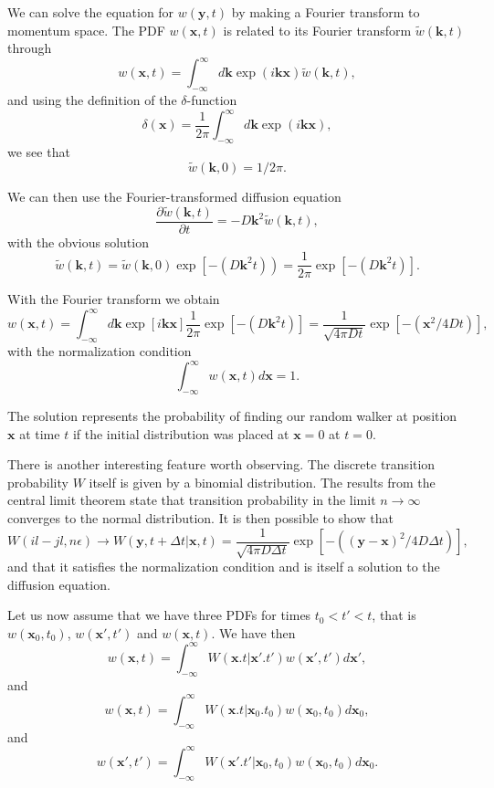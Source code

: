 \documentclass[%
oneside,                 %
final,                   %
10pt]{article}
\begin{document}
We can solve the equation for $w(\mathbf{y},t)$ by making a Fourier transform to
momentum space. 
The PDF $w(\mathbf{x},t)$ is related to its Fourier transform
$\tilde{w}(\mathbf{k},t)$ through
\[
   w(\mathbf{x},t) = \int_{-\infty}^{\infty}d\mathbf{k} \exp{(i\mathbf{kx})}\tilde{w}(\mathbf{k},t),
\]
and using the definition of the 
$\delta$-function 
\[
   \delta(\mathbf{x}) = \frac{1}{2\pi} \int_{-\infty}^{\infty}d\mathbf{k} \exp{(i\mathbf{kx})},
\]
 we see that
\[
   \tilde{w}(\mathbf{k},0)=1/2\pi.
\]

We can then use the Fourier-transformed diffusion equation 
\[
    \frac{\partial \tilde{w}(\mathbf{k},t)}{\partial t} = -D\mathbf{k}^2\tilde{w}(\mathbf{k},t),
\]
with the obvious solution
\[
   \tilde{w}(\mathbf{k},t)=\tilde{w}(\mathbf{k},0)\exp{\left[-(D\mathbf{k}^2t)\right)}=
    \frac{1}{2\pi}\exp{\left[-(D\mathbf{k}^2t)\right]}. 
\]

With the Fourier transform we obtain 
\[
   w(\mathbf{x},t)=\int_{-\infty}^{\infty}d\mathbf{k} \exp{\left[i\mathbf{kx}\right]}\frac{1}{2\pi}\exp{\left[-(D\mathbf{k}^2t)\right]}=
    \frac{1}{\sqrt{4\pi Dt}}\exp{\left[-(\mathbf{x}^2/4Dt)\right]}, 
\]
with the normalization condition
\[
   \int_{-\infty}^{\infty}w(\mathbf{x},t)d\mathbf{x}=1.
\]

The solution represents the probability of finding
our random walker at position $\mathbf{x}$ at time $t$ if the initial distribution 
was placed at $\mathbf{x}=0$ at $t=0$. 

There is another interesting feature worth observing. The discrete transition probability $W$
itself is given by a binomial distribution.
The results from the central limit theorem state that 
transition probability in the limit $n\rightarrow \infty$ converges to the normal 
distribution. It is then possible to show that
\[
    W(il-jl,n\epsilon)\rightarrow W(\mathbf{y},t+\Delta t|\mathbf{x},t)=
    \frac{1}{\sqrt{4\pi D\Delta t}}\exp{\left[-((\mathbf{y}-\mathbf{x})^2/4D\Delta t)\right]},
\]
and that it satisfies the normalization condition and is itself a solution
to the diffusion equation.

Let us now assume that we have three PDFs for times $t_0 < t' < t$, that is
$w(\mathbf{x}_0,t_0)$, $w(\mathbf{x}',t')$ and $w(\mathbf{x},t)$.
We have then  
\[
   w(\mathbf{x},t)= \int_{-\infty}^{\infty} W(\mathbf{x}.t|\mathbf{x}'.t')w(\mathbf{x}',t')d\mathbf{x}',
\]
and
\[
   w(\mathbf{x},t)= \int_{-\infty}^{\infty} W(\mathbf{x}.t|\mathbf{x}_0.t_0)w(\mathbf{x}_0,t_0)d\mathbf{x}_0,
\]
and
\[
   w(\mathbf{x}',t')= \int_{-\infty}^{\infty} W(\mathbf{x}'.t'|\mathbf{x}_0,t_0)w(\mathbf{x}_0,t_0)d\mathbf{x}_0.
\]
\end{document}
